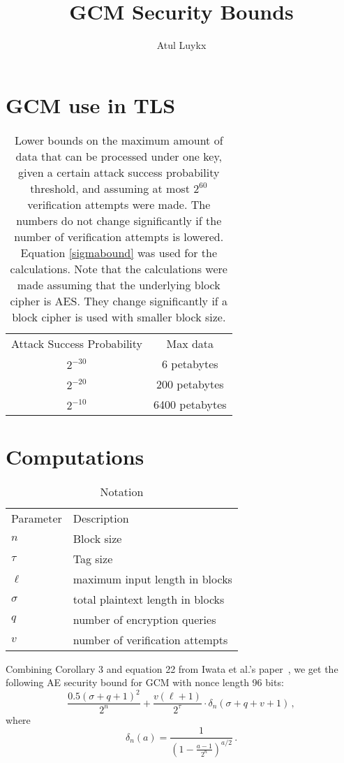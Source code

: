 \documentclass{article}
\title{GCM Security Bounds}
\author{Atul Luykx}
\begin{document}
\maketitle
\section{GCM use in TLS}

\begin{table}[H]
  \centering
  \caption{Lower bounds on the maximum amount of data that can be processed under one key, given a certain attack success probability threshold, and assuming at most $2^{60}$ verification attempts were made. The numbers do not change significantly if the number of verification attempts is lowered. Equation \ref{sigmabound} was used for the calculations. Note that the calculations were made assuming that the underlying block cipher is AES. They change significantly if a block cipher is used with smaller block size.}
  \begin{tabular}{cc}
    \toprule
    Attack Success Probability  & Max data\\
    \cmidrule{1-2}
    $2^{-30}$ & 6 petabytes\\
    $2^{-20}$ & 200 petabytes \\
    $2^{-10}$ & 6400 petabytes\\
    \bottomrule
  \end{tabular}
\end{table}

\section{Computations}
\begin{table}[H]
  \centering
  \caption{Notation}
  \begin{tabular}{ll}
    \toprule
    Parameter & Description\\
    \cmidrule{1-2}
    $n$ & Block size\\
    $\tau$ & Tag size\\
    $\ell$ & maximum input length in blocks\\
    $\sigma$ & total plaintext length in blocks\\
    $q$ & number of encryption queries\\
    $v$ & number of verification attempts\\
    \bottomrule
  \end{tabular}
\end{table}
Combining Corollary 3 and equation 22 from Iwata et al.'s paper~\cite{GCMLNCS,cryptoeprint:2012:438}, we get the following AE security bound for GCM with nonce length 96 bits:
\begin{equation}
  \frac{0.5(\sigma+q+1)^2}{2^{n}} + \frac{v(\ell+1)}{2^{\tau}}\cdot\delta_n(\sigma+q+v+1)\,,
\end{equation}
where
\begin{equation}
  \delta_n(a) = \frac{1}{\left(1 - \frac{a-1}{2^n}\right)^{a/2}}\,.
\end{equation}
\end{document}
